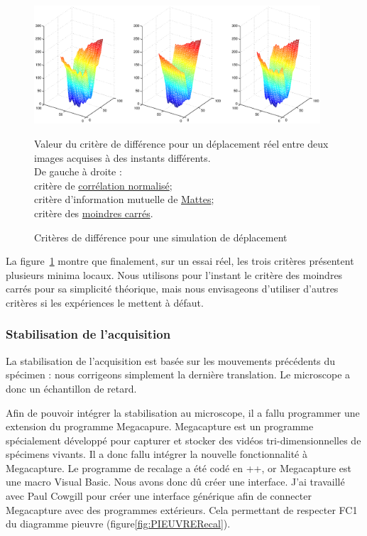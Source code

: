 \begin{figure}[h]
\begin{center}
\leavevmode
\includegraphics[width=0.95\textwidth]{pictures/Recal3DmetricsCMSReal}
\end{center}
\caption{Critères de différence pour une simulation de déplacement}{Valeur du critère de différence pour un déplacement réel entre deux images acquises à des instants différents.\\
De gauche à droite :\\
critère de \href{http://www.itk.org/Doxygen/html/classitk_1_1NormalizedCorrelationImageToImageMetric.html}{corrélation normalisé};\\
critère d'information mutuelle de \href{http://www.itk.org/Doxygen/html/classitk_1_1MattesMutualInformationImageToImageMetric.html}{Mattes};\\
critère des \href{http://www.itk.org/Doxygen/html/classitk_1_1MeanSquaresImageToImageMetric.html}{moindres carrés}. }
\label{fig:RecalMetricReal}
\end{figure}


La figure~\ref{fig:RecalMetricReal} montre que finalement, sur un essai réel, les trois critères présentent plusieurs minima locaux.
Nous utilisons pour l'instant le critère des moindres carrés pour sa simplicité théorique, mais nous envisageons d'utiliser d'autres critères si les expériences le mettent à défaut.


\subsubsection{Stabilisation de l'acquisition}

La stabilisation de l'acquisition est basée sur les mouvements précédents du spécimen :
nous corrigeons simplement la dernière translation. Le microscope a donc un échantillon de retard.

Afin de pouvoir intégrer la stabilisation au microscope, il a fallu programmer une extension du programme Megacapure.
Megacapture est un programme spécialement développé pour capturer et stocker
des vidéos tri-dimensionnelles de spécimens vivants.
Il a donc fallu intégrer la nouvelle fonctionnalité à Megacapture. Le programme de recalage a été codé en {\C++},
or Megacapture est une macro Visual Basic. Nous avons donc dû créer une interface.
J'ai travaillé avec Paul Cowgill pour créer une interface générique afin de connecter
Megacapture avec des programmes extérieurs. Cela permettant de respecter FC1 du diagramme pieuvre
(figure\ref{fig:PIEUVRERecal}).

